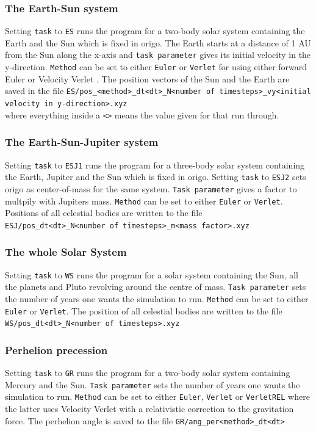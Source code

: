 \documentclass{article}
\begin{document}
\subsubsection*{The Earth-Sun system}
Setting \texttt{task} to \texttt{ES} runs the program for a two-body solar system containing the Earth and the Sun which is fixed in origo. The Earth starts at a distance of 1 AU from the Sun along  the x-axis and \texttt{task parameter} gives its initial velocity in the y-direction. \texttt{Method} can be set to either \texttt{Euler} or \texttt{Verlet} for using either forward Euler or Velocity Verlet . The position vectors of the Sun and the Earth are saved in the file \texttt{ES/pos\_<method>\_dt<dt>\_N<number of timesteps>\_vy<initial velocity in y-direction>.xyz}\\ where everything inside a \texttt{<>} means the value given for that run through.
\subsubsection*{The Earth-Sun-Jupiter system}
Setting \texttt{task} to \texttt{ESJ1} runs the program for a three-body solar system containing the Earth, Jupiter and the Sun which is fixed in origo. Setting \texttt{task} to \texttt{ESJ2} sets origo as center-of-mass for the same system. \texttt{Task parameter} gives a factor to multpily with Jupiters mass. \texttt{Method} can be set to either \texttt{Euler} or \texttt{Verlet}. 
Positions of all celestial bodies are written to the file \\ \texttt{ESJ/pos\_dt<dt>\_N<number of timesteps>\_m<mass factor>.xyz}
\subsubsection*{The whole Solar System}
Setting \texttt{task} to \texttt{WS} runs the program for a solar system containing the Sun, all the planets and Pluto revolving around the centre of mass. \texttt{Task parameter} sets the number of years one wants the simulation to run. \texttt{Method} can be set to either \texttt{Euler} or \texttt{Verlet}. The position of all celestial bodies are written to the file \\ 
\texttt{WS/pos\_dt<dt>\_N<number of timesteps>.xyz}
\subsubsection*{Perhelion precession}
Setting \texttt{task} to \texttt{GR} runs the program for a two-body solar system containing Mercury and the Sun. \texttt{Task parameter} sets the number of years one wants the simulation to run. \texttt{Method} can be set to either \texttt{Euler}, \texttt{Verlet} or \texttt{VerletREL} where the latter uses Velocity Verlet with a relativistic correction to the gravitation force. The perhelion angle is saved to the file
\texttt{GR/ang\_per<method>\_dt<dt>}
\end{document}
